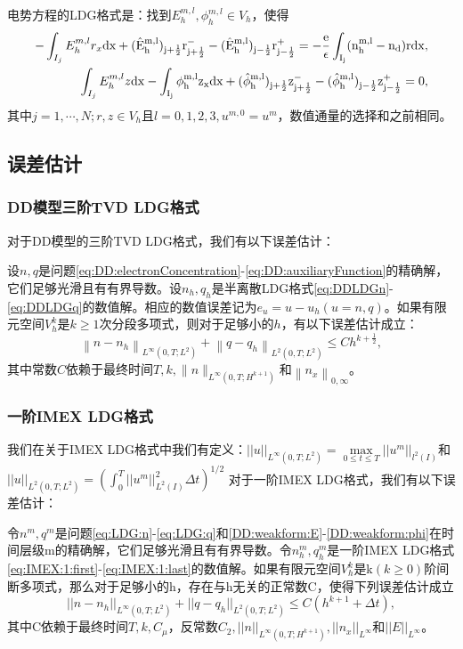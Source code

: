 电势方程的LDG格式是：找到$E_h^{m,l},\phi_h^{m,l} \in V_h$，使得
\begin{align}
	-\int_{I_j} E_h^{m,l}r_x \rm{d}x + (\hat{E}_h^{m,l})_{j+\frac{1}{2}}r_{j+\frac{1}{2}}^- - (\hat{E}_h^{m,l})_{j-\frac{1}{2}}r_{j-\frac{1}{2}}^+ = -\frac{e}{\epsilon}\int_{I_j}(n_h^{m,l} - n_d) r\rm{d} x, \label{eq:IMEX:poisson:LDG:1} \\
	\int_{I_j} E_h^{m,l}z \rm{d}x - \int_{I_j} \phi_h^{m,l}z_x \rm{d}x  + (\hat{\phi}_h^{m,l})_{j+\frac{1}{2}}z^-_{j+\frac{1}{2}} - (\hat{\phi}_h^{m,l})_{j-\frac{1}{2}}z_{j-\frac{1}{2}}^+  = 0,\label{eq:IMEX:poisson:LDG:2}
\end{align}
其中$j = 1,\cdots,N; r,z \in V_h$且$l = 0,1,2,3, u^{m,0} = u^m$，数值通量的选择和之前相同。

\subsection{误差估计}
\subsubsection{DD模型三阶TVD LDG格式}
对于DD模型的三阶TVD LDG格式，我们有以下误差估计\cite{liu2010error}：
\begin{theorem}
	设$n, q$是问题\eqref{eq:DD:electronConcentration}-\eqref{eq:DD:auxiliaryFunction}的精确解，它们足够光滑且有有界导数。设$n_h, q_h$是半离散LDG格式\eqref{eq:DDLDGn}-\eqref{eq:DDLDGq}的数值解。相应的数值误差记为$e_{u}=u-u_{h}(u=n, q)$。如果有限元空间$V_{h}^{k}$是$k \geq 1$次分段多项式，则对于足够小的$h$，有以下误差估计成立：
	\begin{equation}
		\left\|n-n_h\right\|_{L^{\infty}\left(0, T ; L^{2}\right)}+\left\|q-q_h\right\|_{L^{2}\left(0, T ; L^{2}\right)} \leq C h^{k+\frac{1}{2}},
	\end{equation}
	其中常数$C$依赖于最终时间$T,k, \|n\|_{L^{\infty}\left(0, T ; H^{k+1}\right)}$和$\left\|n_{x}\right\|_{0, \infty}$。
\end{theorem}

\subsubsection{一阶IMEX LDG格式}
我们在关于IMEX LDG格式中我们有定义：$||u||_{L^{\infty}(0,T;L^2)}  = \max \limits_{0 \leq t \leq T}||u^m||_{l^2(I)}$和$||u||_{L^2(0,T;L^2)} = (\int_{0}^{T}||u^m||_{L^2(I)}^2\Delta t)^{1/2}$
对于一阶IMEX LDG格式，我们有以下误差估计\cite{liu2016analysis}：
\begin{theorem}
	令$n^m,q^m$是问题\eqref{eq:LDG:n}-\eqref{eq:LDG:q}和\eqref{DD:weakform:E}-\eqref{DD:weakform:phi}在时间层级m的精确解，它们足够光滑且有有界导数。令$n_h^m,q_h^m$是一阶IMEX LDG格式\eqref{eq:IMEX:1:first}-\eqref{eq:IMEX:1:last}的数值解。如果有限元空间$V_h^k$是k$(k\geq  0)$阶间断多项式，那么对于足够小的h，存在与h无关的正常数C，使得下列误差估计成立
	\begin{equation}
		||n-n_h||_{L^{\infty}(0,T;L^2)} + ||q - q_h||_{L^2(0,T;L^2)} \leq C(h^{k+1} + \Delta t), \label{eq:IMEX:es:1}
	\end{equation}
	其中C依赖于最终时间$T,k,C_{\mu}$，反常数$C_2, ||n||_{L^{\infty}(0,T;H^{k+1})}, ||n_x||_{L^{\infty}}$和$||E||_{L^{\infty}}$。
\end{theorem}
